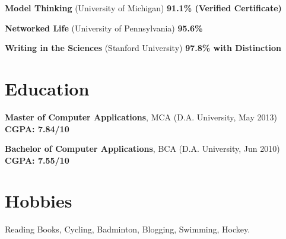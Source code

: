 \documentclass[overlapped,centered]{resume}
\begin{document}
\begin{resume}
\begin{list2}
    \item \textbf{Model Thinking} (University of Michigan) \hspace{44mm} \textbf{91.1\% (Verified Certificate)}

	\item \textbf{Networked Life} (University of Pennsylvania) \hspace{77mm} \textbf{95.6\%}

	\item \textbf{Writing in the Sciences} (Stanford University) \hspace{45mm} \textbf{97.8\% with Distinction}
	\end{list2}

    \section{\mysidestyle Education}

    \begin{list2}
	\item \textbf{Master of Computer Applications}, MCA (D.A. University, May 2013) \hspace{16mm} \textbf{CGPA: 7.84/10} 
	\end{list2}

	\begin{list2}
	\item \textbf{Bachelor of Computer Applications}, BCA (D.A. University, Jun 2010) \hspace{15mm} \textbf{CGPA: 7.55/10}
	\end{list2}

    \section{\mysidestyle Hobbies}
    \begin{list2}
    \item Reading Books, Cycling, Badminton, Blogging, Swimming, Hockey.
     
    \end{list2}

\end{resume}
\end{document}
